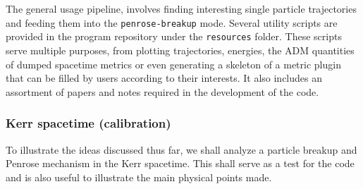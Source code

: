 %
The general usage pipeline, involves finding interesting single particle trajectories and feeding them into the \texttt{penrose-breakup} mode. Several utility scripts are provided in the program repository under the \texttt{resources} folder. These scripts serve multiple purposes, from plotting trajectories, energies, the ADM quantities of dumped spacetime metrics or even generating a skeleton of a metric plugin that can be filled by users according to their interests. It also includes an assortment of papers and notes required in the development of the code.

\subsubsection{Kerr spacetime (calibration)}

To illustrate the ideas discussed thus far, we shall analyze a particle breakup and Penrose mechanism in the Kerr spacetime. This shall serve as a test for the code and is also useful to illustrate the main physical points made.

%